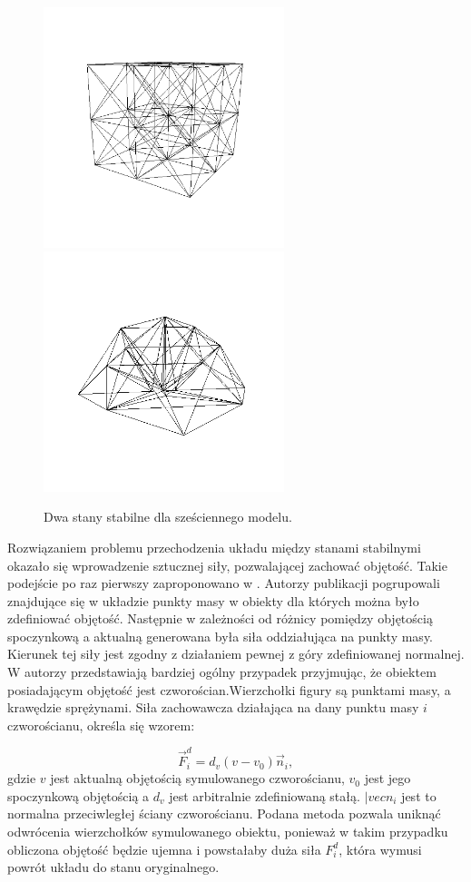 \begin{figure}[ht]
\centering
\includegraphics[width=7cm, height=7cm]{images/stabilny.png}
\includegraphics[width=7cm, height=7cm]{images/niestabilny.png}
\caption{Dwa stany stabilne dla sześciennego modelu.}
\label{stany}
\end{figure}

Rozwiązaniem problemu przechodzenia układu między stanami stabilnymi okazało się
wprowadzenie sztucznej siły, pozwalającej zachować objętość. Takie podejście po
raz pierwszy zaproponowano w \cite{rmofa}. Autorzy publikacji pogrupowali
znajdujące się w układzie punkty masy w obiekty dla których można było
zdefiniować objętość. Następnie w zależności od różnicy pomiędzy objętością
spoczynkową a aktualną generowana była siła oddziałująca na punkty masy. Kierunek
tej siły jest zgodny z działaniem pewnej z góry zdefiniowanej normalnej. W
\cite{isodb} autorzy przedstawiają bardziej ogólny przypadek przyjmując, że
obiektem posiadającym objętość jest czworościan.Wierzchołki figury są punktami
masy, a krawędzie sprężynami. Siła zachowawcza działająca na dany punktu masy
$i$ czworościanu, określa się wzorem:

\begin{equation}
\vec{F}_i^d = d_v ( v - v_0) \vec{n}_i,
\end{equation}
gdzie $v$ jest aktualną objętością symulowanego czworościanu, $v_0$ jest jego
spoczynkową objętością a $d_v$ jest arbitralnie zdefiniowaną stałą. $|vec{n}_i$ jest
to normalna przeciwległej ściany czworościanu. Podana metoda pozwala uniknąć
odwrócenia wierzchołków symulowanego obiektu, ponieważ w takim przypadku
obliczona objętość będzie ujemna i powstałaby duża siła $F_i^d$, która wymusi powrót
układu do stanu oryginalnego\cite{isodb}.

